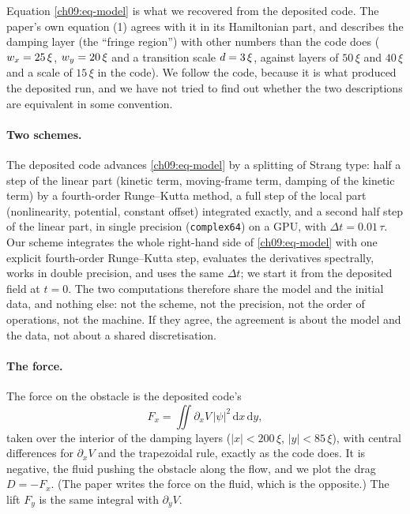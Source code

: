 Equation \eqref{ch09:eq-model} is what we recovered from the deposited code. The paper's own equation (1) agrees with it in its Hamiltonian part, and describes the damping layer (the ``fringe region'') with other numbers than the code does ($w_x=25\,\xi$, $w_y=20\,\xi$ and a transition scale $d=3\,\xi$, against layers of $50\,\xi$ and $40\,\xi$ and a scale of $15\,\xi$ in the code). We follow the code, because it is what produced the deposited run, and we have not tried to find out whether the two descriptions are equivalent in some convention.

\paragraph{Two schemes.} The deposited code advances \eqref{ch09:eq-model} by a splitting of Strang type: half a step of the linear part (kinetic term, moving-frame term, damping of the kinetic term) by a fourth-order Runge--Kutta method, a full step of the local part (nonlinearity, potential, constant offset) integrated exactly, and a second half step of the linear part, in single precision (\texttt{complex64}) on a GPU, with $\Delta t=0.01\,\tau$. Our scheme integrates the whole right-hand side of \eqref{ch09:eq-model} with one explicit fourth-order Runge--Kutta step, evaluates the derivatives spectrally, works in double precision, and uses the same $\Delta t$; we start it from the deposited field at $t=0$. The two computations therefore share the model and the initial data, and nothing else: not the scheme, not the precision, not the order of operations, not the machine. If they agree, the agreement is about the model and the data, not about a shared discretisation.

\paragraph{The force.} The force on the obstacle is the deposited code's
\begin{equation}\label{ch09:eq-force}
F_x=\iint \partial_xV\,|\psi|^2\,\mathrm dx\,\mathrm dy ,
\end{equation}
taken over the interior of the damping layers ($|x|<200\,\xi$, $|y|<85\,\xi$), with central differences for $\partial_xV$ and the trapezoidal rule, exactly as the code does. It is negative, the fluid pushing the obstacle along the flow, and we plot the drag $D=-F_x$. (The paper writes the force on the fluid, which is the opposite.) The lift $F_y$ is the same integral with $\partial_yV$.

